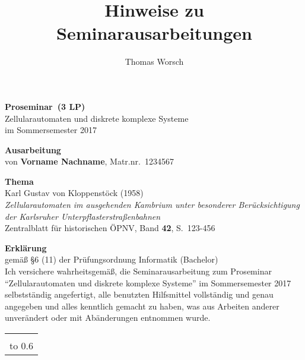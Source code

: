 \documentclass[11pt]{article}
\author{Thomas Worsch}
\title{Hinweise zu Seminarausarbeitungen}
\newcommand{\teilnehmername}{Vorname Nachname} %
\newcommand{\teilnehmermatrnr}{1234567}        %
\newcommand{\seminarart}{Proseminar}           %
\newcommand{\seminarlp}{3 LP}                  %
\newcommand{\seminarjahr}{2017}                %
\begin{document}
{\thispagestyle{empty}\large\sffamily\raggedright
%
%
\unskip %
\noindent \textbf{\Large \seminarart\ (\seminarlp)} 
\\[\baselineskip]
%
Zellularautomaten und diskrete komplexe Systeme
\\[1ex]
%
im Sommersemester \seminarjahr

\vspace*{3\baselineskip}

\noindent \textbf{\Large Ausarbeitung} \\[\baselineskip]
%
von \textbf{\teilnehmername}, Matr.nr.~\teilnehmermatrnr

\vspace*{3\baselineskip}

\noindent \textbf{\Large Thema} \\[\baselineskip]
%
%
Karl Gustav von Kloppenstöck (1958)\\[1ex]
%
\textit{Zellularautomaten im ausgehenden Kambrium unter besonderer
  Berücksichtigung der Karlsruher Unterpflasterstraßenbahnen}\\[1ex]
%
Zentralblatt für historischen ÖPNV, Band \textbf{42}, S.~123-456
}
\clearpage
{\thispagestyle{empty}\raggedright

\noindent \textbf{\Large Erklärung}\\[1ex]
gemäß \S 6 (11) der Prüfungsordnung Informatik %
(Bachelor) %
\\[\baselineskip]

\noindent
Ich versichere wahrheitsgemäß, die Seminarausarbeitung zum
\seminarart{} "`Zellularautomaten und diskrete komplexe Systeme"' im
Sommersemester \seminarjahr{} selbstständig angefertigt, alle
benutzten Hilfsmittel vollständig und genau angegeben und alles
kenntlich gemacht zu haben, was aus Arbeiten anderer unverändert oder
mit Abänderungen entnommen wurde.

\vspace*{30mm}
\noindent
\begin{tabular}{@{}l}
  \hline
   \\[-1ex]
  \hbox to 0.6\textwidth{(\teilnehmername, Matr.nr.~\teilnehmermatrnr) \hss}
\end{tabular}
}
\end{document}

